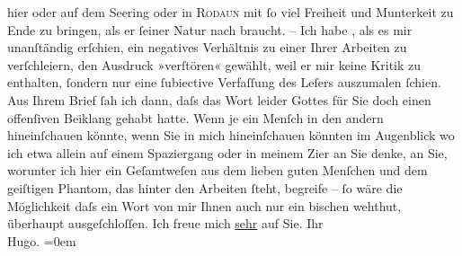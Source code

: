 \begin{ledgroupsized}[t]{13cm}
               hier oder auf dem Se{\geminationm}ering oder in \textsc{Rodaun} mit ſo viel Freiheit und Munterkeit zu Ende zu {\pb}bringen, als er ſeiner Natur nach
               braucht.\pend
           \pstart
           \numberlinefalse{}–\numberlinetrue{}\pend
           \pstart
           Ich habe \label{K_L01789_1v}\label{K_L01789_1h}, als es mir unanſtändig erſchien, ein negatives Verhältnis zu einer
               Ihrer Arbeiten zu verſchleiern,
               den Ausdruck »verſtören« gewählt, weil er mir keine Kritik zu enthalten, ſondern nur
               eine ſubiective Verfaſſung des Leſers auszumalen ſchien. Aus Ihrem Brief ſah ich
               dann, daſs das Wort leider Gottes für Sie doch einen offenſiven {\pb}Beiklang gehabt hatte.\pend
           \pstart
           Wenn je ein Menſch in den andern hineinſchauen könnte, wenn Sie in mich hineinſchauen
               könnten im Augenblick wo ich etwa allein auf einem Spaziergang oder in meinem Zi{\geminationm}er an Sie denke, an Sie, worunter ich hier ein
               Geſamtweſen aus dem lieben guten Menſchen und dem geiſtigen Phantom, das hinter den
               Arbeiten ſteht, begreife – ſo wäre die Möglichkeit daſs ein Wort von mir Ihnen auch
               nur ein bischen wehthut, überhaupt ausgeſchloſſen.\pend
           \pstart
           Ich freue mich \uline{sehr} auf Sie.\pend
           \pstart
           Ihr{\\[\baselineskip]}\spacefill\mbox{Hugo.}\pend
           \leftskip=0em{}          \endnumbering{}\end{ledgroupsized}  \newcommand{\dateiname}{L01789}\newcommand{\titel}{Hugo von Hofmannsthal an Arthur Schnitzler, 14. 9. [1908]}\newcommand{\editorInnen}{Martin Anton Müller und Gerd-Hermann Susen}
            \footnotesize
\begin{ledgroupsized}[t]{11.5cm}
\end{ledgroupsized}
         
      